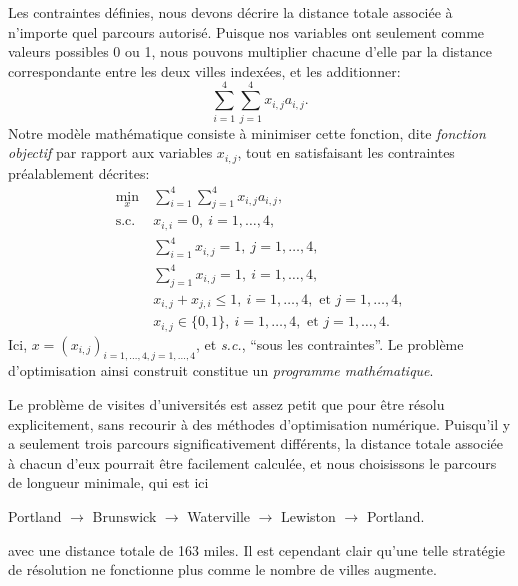 \begin{example}
Les contraintes définies, nous devons décrire la distance totale associée à n'importe quel parcours autorisé.
Puisque nos variables ont seulement comme valeurs possibles 0 ou 1, nous pouvons multiplier chacune d'elle par la distance correspondante entre les deux villes indexées, et les additionner:
\[
\sum_{i = 1}^4 \sum_{j = 1}^4 x_{i,j} a_{i,j}.
\]
Notre modèle mathématique consiste à minimiser cette fonction, dite {\sl fonction objectif} par rapport aux variables $x_{i,j}$, tout en satisfaisant les contraintes préalablement décrites:
\begin{align*}
\min_x \ & \sum_{i = 1}^4 \sum_{j = 1}^4 x_{i,j} a_{i,j}, \\
\mbox{s.c.} \ & x_{i,i} = 0,\ i = 1,\ldots, 4, \\
& \sum_{i = 1}^4 x_{i,j} = 1,\ j = 1,\ldots,4, \\
& \sum_{j = 1}^4 x_{i,j} = 1,\ i = 1,\ldots,4, \\
& x_{i,j} + x_{j ,i} \leq 1,\ i = 1,\ldots, 4,\mbox{ et }j = 1,\ldots,4,\\
& x_{i,j} \in \lbrace 0, 1 \rbrace, \ i = 1,\ldots, 4,\mbox{ et }j = 1,\ldots,4.
\end{align*}
Ici, $x = (x_{i,j})_{i = 1,\ldots, 4, j = 1,\ldots,4}$, et {\sl s.c.}, ``sous les contraintes''.
Le problème d'optimisation ainsi construit constitue un {\sl programme mathématique}.


Le problème de visites d'universités est assez petit que pour être résolu explicitement, sans recourir à des méthodes d'optimisation numérique.
Puisqu'il y a seulement trois parcours significativement différents, la distance totale associée à chacun d'eux pourrait être facilement calculée, et nous choisissons le parcours de longueur minimale, qui est ici
\begin{center}
Portland $\rightarrow$ Brunswick $\rightarrow$ Waterville $\rightarrow$ Lewiston $\rightarrow$ Portland.
\end{center}
avec une distance totale de 163 miles.
Il est cependant clair qu'une telle stratégie de résolution ne fonctionne plus comme le nombre de villes augmente.
\end{example}

